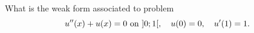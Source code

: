 \bexo
What is the weak form associated to problem
\begin{equation}
	u''(x)+u(x)=0 \textrm{ on } ]0;1[, \quad u(0)=0 , \quad u'(1)=1. 
\end{equation}

\eexo

